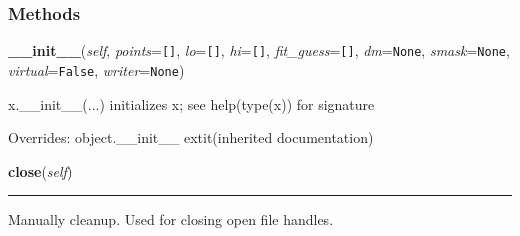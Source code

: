 
  \subsubsection{Methods}

    \vspace{0.5ex}

\hspace{.8\funcindent}\begin{boxedminipage}{\funcwidth}

    \raggedright \textbf{\_\_init\_\_}(\textit{self}, \textit{points}={\tt []}, \textit{lo}={\tt []}, \textit{hi}={\tt []}, \textit{fit\_guess}={\tt []}, \textit{dm}={\tt None}, \textit{smask}={\tt None}, \textit{virtual}={\tt False}, \textit{writer}={\tt None})

\setlength{\parskip}{2ex}
    x.\_\_init\_\_(...) initializes x; see help(type(x)) for signature

\setlength{\parskip}{1ex}
      Overrides: object.\_\_init\_\_ 	extit{(inherited documentation)}

    \end{boxedminipage}

    \label{Tiling:Tile:close}

    \vspace{0.5ex}

\hspace{.8\funcindent}\begin{boxedminipage}{\funcwidth}

    \raggedright \textbf{close}(\textit{self})

    \vspace{-1.5ex}

    \rule{\textwidth}{0.5\fboxrule}
\setlength{\parskip}{2ex}
    Manually cleanup. Used for closing open file handles.

\setlength{\parskip}{1ex}
    \end{boxedminipage}

    \label{Tiling:Tile:extend_dimension}

    \vspace{0.5ex}

